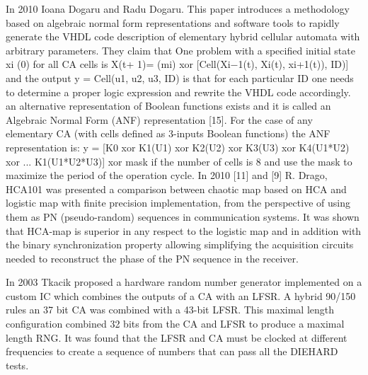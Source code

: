 In 2010 Ioana Dogaru and Radu Dogaru. This paper introduces a methodology based on algebraic normal form representations and software tools to rapidly generate the VHDL code description of elementary hybrid cellular automata with arbitrary parameters. They claim that One problem with a specified initial state xi (0) for all CA cells is X(t+ 1)= (mi) xor [Cell(Xi−1(t), Xi(t), xi+1(t)), ID)] and the output y = Cell(u1, u2, u3, ID) is that for each particular ID one needs to determine a proper logic expression and rewrite the VHDL code accordingly. an alternative representation of
Boolean functions exists and it is called an Algebraic Normal Form (ANF) representation [15]. For the case of any elementary CA (with cells defined as 3-inputs Boolean functions) the ANF representation is: y = [K0 xor K1(U1) xor K2(U2) xor K3(U3) xor K4(U1*U2) xor ... K1(U1*U2*U3)] xor mask if the number of cells is 8 and use the mask to maximize the period of the operation cycle.
In 2010 [11] and [9] R. Drago, HCA101 was presented a comparison between chaotic map based on HCA and logistic map with finite precision implementation, from the perspective of using them as PN (pseudo-random) sequences in communication systems. It was shown that HCA-map is superior in any respect to the logistic map and in addition with the binary synchronization property allowing simplifying the acquisition circuits needed to reconstruct the phase of the PN sequence in the receiver.

In 2003 Tkacik proposed a hardware random number generator implemented on a custom IC which combines the outputs of a CA with an LFSR. A hybrid 90/150 rules an 37 bit CA was combined with a 43-bit LFSR. This maximal length configuration combined 32 bits from the CA and LFSR to produce a maximal length RNG. It was found that the LFSR and CA must be clocked at different frequencies to create a sequence of numbers that can pass all the DIEHARD tests.

